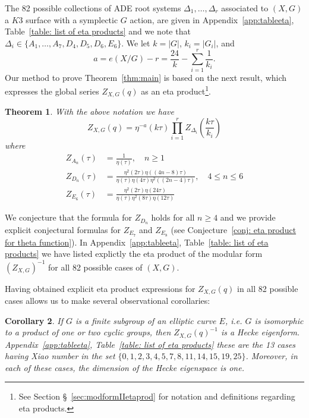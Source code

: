 \documentclass{article}
\newtheorem{theorem}{Theorem}[section]
\newtheorem{corollary}[theorem]{Corollary}
\theoremstyle{definition}
\begin{document}
The 82 possible collections of ADE root systems $\Delta_{1},\dots
,\Delta_{r}$ associated to $(X,G)$ a $K3$ surface with a symplectic
$G$ action, are given in Appendix~\ref{app:tableeta}, Table~\ref{table: list of eta products} and
we note that $\Delta_{i}\in \{A_{1},\dots
,A_{7},D_{4},D_{5},D_{6},E_{6} \}$. We let $k=|G|$, $k_{i}=|G_{i}|$,
and
\[
a = e(X/G) - r=\frac{24}{k}-\sum_{i=1}^{r} \frac{1}{k_{i}}.
\]
Our method to prove Theorem~\ref{thm:main} is based on the next result, which expresses the global series $Z_{X,G}(q)$ as an eta product\footnote{See
	Section \S~\ref{sec:modformIIetaprod}  for notation and definitions regarding eta products.}.
\begin{theorem}\label{thm: eta product formula for Z}
With the above notation we have
\[
Z_{X,G}(q) = \eta^{-a}(k\tau )\prod_{i=1}^{r}
Z_{\Delta_{i}}\left(\frac{k\tau}{k_{i}} \right)
\]
where 
\begin{align*}
Z_{A_{n}} (\tau ) &=\frac{1}{\eta (\tau )}, \quad n\geq 1\\
Z_{D_{n}} (\tau ) &=\frac{\eta^{2}(2\tau )\eta((4n-8)\tau )}{\eta (\tau )\eta (4\tau )\eta^{2}((2n-4)\tau )}, \quad 4\leq n\leq 6\\
Z_{E_{6}} (\tau ) &=\frac{\eta^{2}(2\tau )\eta(24\tau )}{\eta (\tau
)\eta^{2} (8\tau )\eta(12\tau )}
\end{align*}
\end{theorem}
We conjecture that the formula for $Z_{D_{n}}$ holds for all $n\geq 4$
and we provide explicit conjectural formulas for $Z_{E_{7}}$ and
$Z_{E_{8}}$ (see Conjecture~\ref{conj: eta product for theta
function}). In Appendix~\ref{app:tableeta}, Table~\ref{table: list of eta products} we have listed
explictly the eta product of the modular form $(Z_{X,G})^{-1}$ for all
82 possible cases of $(X,G)$.

Having obtained explicit eta product expressions for $Z_{X,G}(q)$ in all 82 possible
cases allows us to make several observational corollaries:

\begin{corollary}\label{cor: if G is a subgp of E then Zinv is a Hecke
eigenform}
If $G$ is a finite subgroup of an elliptic curve $E$, i.e. $G$ is
isomorphic to a product of one or two cyclic groups, then
$Z_{X,G}(q)^{-1}$ is a Hecke eigenform. Appendix~\ref{app:tableeta}, Table~\ref{table: list of
eta products} these are the 13 cases having Xiao number in the set
$\{0,1,2,3,4,5,7,8,11,14,15,19,25 \}$. Moreover, in each of these
cases, the dimension of the Hecke eigenspace is one. 
\end{corollary}
\end{document}
